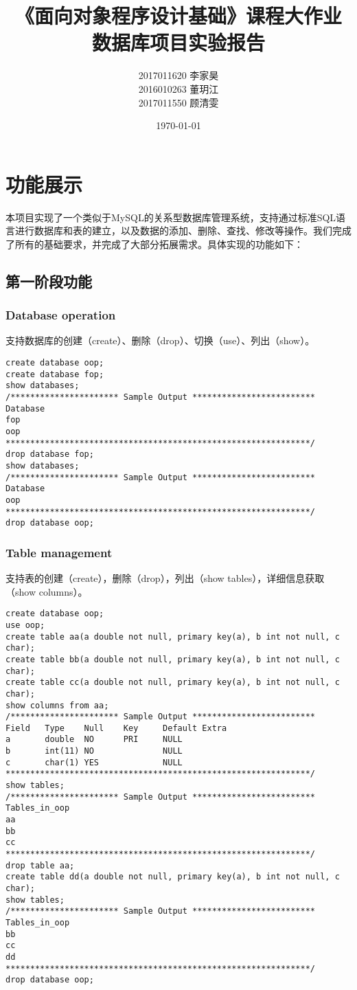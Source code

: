 \documentclass[12pt,a4paper]{article}
\title{《面向对象程序设计基础》课程大作业 \\ 数据库项目实验报告}
\author{2017011620 李家昊 \\ 2016010263 董玥江 \\ 2017011550 顾清雯}
\date{\today}
\begin{document}
\maketitle

\section{功能展示}

本项目实现了一个类似于MySQL的关系型数据库管理系统，支持通过标准SQL语言进行数据库和表的建立，以及数据的添加、删除、查找、修改等操作。我们完成了所有的基础要求，并完成了大部分拓展需求。具体实现的功能如下：

\subsection{第一阶段功能}

\subsubsection{Database operation}

支持数据库的创建（create）、删除（drop）、切换（use）、列出（show）。

\begin{lstlisting}
create database oop;
create database fop;
show databases; 
/********************** Sample Output *************************
Database
fop
oop
**************************************************************/
drop database fop;
show databases; 
/********************** Sample Output *************************
Database
oop
**************************************************************/
drop database oop;
\end{lstlisting}

\subsubsection{Table management}

支持表的创建（create），删除（drop），列出（show tables），详细信息获取（show columns）。

\begin{lstlisting}
create database oop; 
use oop;
create table aa(a double not null, primary key(a), b int not null, c char); 
create table bb(a double not null, primary key(a), b int not null, c char); 
create table cc(a double not null, primary key(a), b int not null, c char); 
show columns from aa; 
/********************** Sample Output *************************
Field   Type    Null    Key     Default Extra
a       double  NO      PRI     NULL
b       int(11) NO              NULL
c       char(1) YES             NULL
**************************************************************/
show tables;
/********************** Sample Output *************************
Tables_in_oop
aa
bb
cc
**************************************************************/
drop table aa;
create table dd(a double not null, primary key(a), b int not null, c char); 
show tables; 
/********************** Sample Output *************************
Tables_in_oop
bb
cc
dd
**************************************************************/
drop database oop;
\end{lstlisting}
\end{document}
